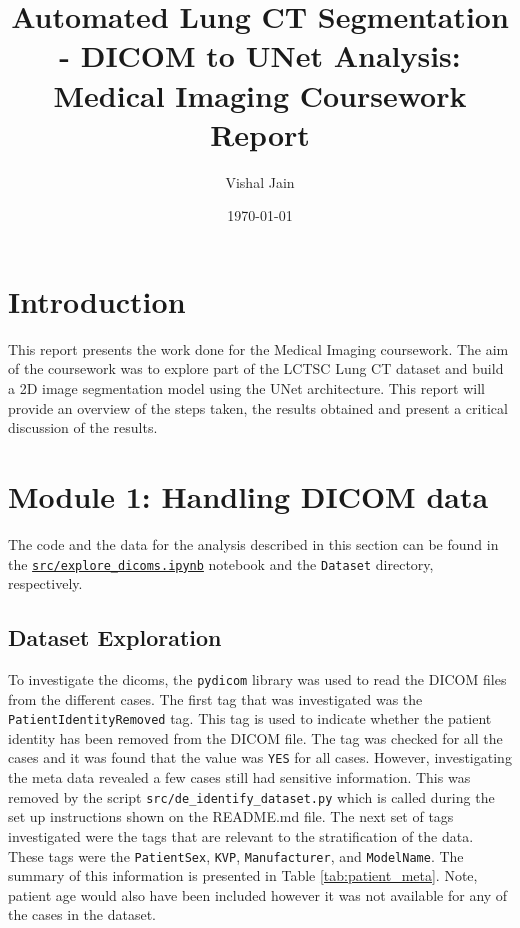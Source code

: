 \documentclass[11pt]{article}
\title{Automated Lung CT Segmentation -  DICOM to UNet Analysis: Medical Imaging Coursework Report}
\author{Vishal Jain}
\date{\today}
\begin{document}
\maketitle

\tableofcontents

\newpage

\section{Introduction}
This report presents the work done for the Medical Imaging coursework. The aim of the coursework was to explore part of the LCTSC Lung CT dataset and build a 2D image segmentation model using the UNet architecture. This report will provide an overview of the steps taken, the results obtained and present a critical discussion of the results.

\section{Module 1: Handling DICOM data}
The code and the data for the analysis described in this section can be found in the \texttt{\url{src/explore_dicoms.ipynb}} notebook and the \texttt{Dataset} directory, respectively.

\subsection{Dataset Exploration}
To investigate the dicoms, the \texttt{pydicom} library was used to read the DICOM files from the different cases. The first tag that was investigated was the \texttt{PatientIdentityRemoved} tag. This tag is used to indicate whether the patient identity has been removed from the DICOM file. The tag was checked for all the cases and it was found that the value was \texttt{YES} for all cases. However, investigating the meta data revealed a few cases still had sensitive information. This was removed by the script \texttt{src/de\_identify\_dataset.py} which is called during the set up instructions shown on the README.md file. The next set of tags investigated were the tags that are relevant to the stratification of the data. These tags were the \texttt{PatientSex}, \texttt{KVP}, \texttt{Manufacturer}, and \texttt{ModelName}. The summary of this information is presented in Table \ref{tab:patient_meta}. Note, patient age would also have been included however it was not available for any of the cases in the dataset.
\end{document}
